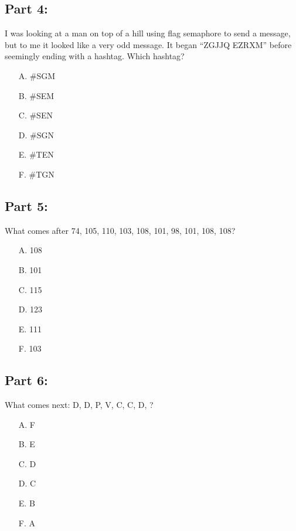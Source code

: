\documentclass[12pt]{article}
\begin{document}
\pagebreak

\subsection*{Part 4:}

I was looking at a man on top of a hill using flag semaphore to send a message,
but to me it looked like a very odd message. It began ``ZGJJQ EZRXM'' before
seemingly ending with a hashtag. Which hashtag?

\begin{itemize}
  \item[A.] \#SGM
  \item[B.] \#SEM
  \item[C.] \#SEN
  \item[D.] \#SGN
  \item[E.] \#TEN
  \item[F.] \#TGN
\end{itemize}

\pagebreak

\subsection*{Part 5:}

What comes after 74, 105, 110, 103, 108, 101, 98, 101, 108, 108?

\begin{itemize}
  \item[A.] 108
  \item[B.] 101
  \item[C.] 115
  \item[D.] 123
  \item[E.] 111
  \item[F.] 103
\end{itemize}

\pagebreak

\subsection*{Part 6:}

What comes next: D, D, P, V, C, C, D, ?

\begin{itemize}
  \item[A.] F
  \item[B.] E
  \item[C.] D
  \item[D.] C
  \item[E.] B
  \item[F.] A
\end{itemize}
\end{document}
